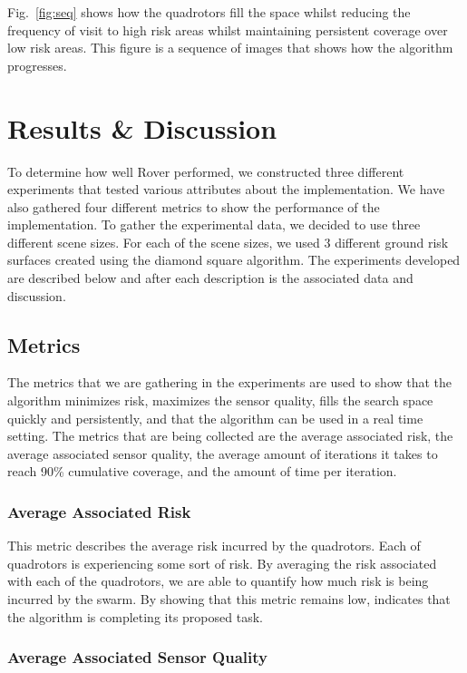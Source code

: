 \documentclass{article}
\begin{document}
Fig.~\ref{fig:seq} shows how the quadrotors fill the space whilst reducing the
frequency of visit to high risk areas whilst maintaining persistent coverage
over low risk areas. This figure is a sequence of images that shows how the
algorithm progresses.

\section{Results \& Discussion}

To determine how well Rover performed, we constructed three different
experiments that tested various attributes about the implementation. We have
also gathered four different metrics to show the performance of the
implementation. To gather the experimental data, we decided to use three
different scene sizes. For each of the scene sizes, we used 3 different ground
risk surfaces created using the diamond square algorithm. The experiments
developed are described below and after each description is the associated data
and discussion.

\subsection{Metrics}

The metrics that we are gathering in the experiments are used to show that the
algorithm minimizes risk, maximizes the sensor quality, fills the search space
quickly and persistently, and that the algorithm can be used in a real time
setting. The metrics that are being collected are the average associated risk,
the average associated sensor quality, the average amount of iterations it
takes to reach 90\% cumulative coverage, and the amount of time per iteration.

\subsubsection{Average Associated Risk}

This metric describes the average risk incurred by the quadrotors. Each of
quadrotors is experiencing some sort of risk. By averaging the risk associated
with each of the quadrotors, we are able to quantify how much risk is being
incurred by the swarm. By showing that this metric remains low, indicates that
the algorithm is completing its proposed task.

\subsubsection{Average Associated Sensor Quality}
\end{document}
